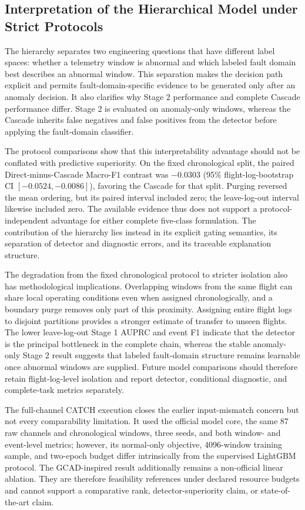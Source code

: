 \subsection{Interpretation of the Hierarchical Model under Strict Protocols}

The hierarchy separates two engineering questions that have different label spaces: whether a telemetry window is abnormal and which labeled fault domain best describes an abnormal window. This separation makes the decision path explicit and permits fault-domain-specific evidence to be generated only after an anomaly decision. It also clarifies why Stage 2 performance and complete Cascade performance differ. Stage 2 is evaluated on anomaly-only windows, whereas the Cascade inherits false negatives and false positives from the detector before applying the fault-domain classifier.

The protocol comparisons show that this interpretability advantage should not be conflated with predictive superiority. On the fixed chronological split, the paired Direct-minus-Cascade Macro-F1 contrast was $-0.0303$ (95\% flight-log-bootstrap CI $[-0.0524,-0.0086]$), favoring the Cascade for that split. Purging reversed the mean ordering, but its paired interval included zero; the leave-log-out interval likewise included zero. The available evidence thus does not support a protocol-independent advantage for either complete five-class formulation. The contribution of the hierarchy lies instead in its explicit gating semantics, its separation of detector and diagnostic errors, and its traceable explanation structure.

The degradation from the fixed chronological protocol to stricter isolation also has methodological implications. Overlapping windows from the same flight can share local operating conditions even when assigned chronologically, and a boundary purge removes only part of this proximity. Assigning entire flight logs to disjoint partitions provides a stronger estimate of transfer to unseen flights. The lower leave-log-out Stage 1 AUPRC and event F1 indicate that the detector is the principal bottleneck in the complete chain, whereas the stable anomaly-only Stage 2 result suggests that labeled fault-domain structure remains learnable once abnormal windows are supplied. Future model comparisons should therefore retain flight-log-level isolation and report detector, conditional diagnostic, and complete-task metrics separately.

The full-channel CATCH execution closes the earlier input-mismatch concern but not every comparability limitation. It used the official model core, the same 87 raw channels and chronological windows, three seeds, and both window- and event-level metrics; however, its normal-only objective, 4096-window training sample, and two-epoch budget differ intrinsically from the supervised LightGBM protocol. The GCAD-inspired result additionally remains a non-official linear ablation. They are therefore feasibility references under declared resource budgets and cannot support a comparative rank, detector-superiority claim, or state-of-the-art claim.
